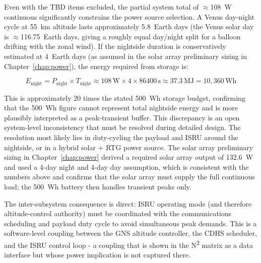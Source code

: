 Even with the TBD items excluded, the partial system total of $\approx$108~W continuous significantly constrains the power source selection. A Venus day-night cycle at 55~km altitude lasts approximately 5.8~Earth days (the Venus solar day is $\approx$116.75~Earth days, giving a roughly equal day/night split for a balloon drifting with the zonal wind). If the nightside duration is conservatively estimated at 4~Earth days (as assumed in the solar array preliminary sizing in Chapter~\ref{chap:power}), the energy required from storage is:

\begin{equation}
E_{\mathrm{night}} = P_{\mathrm{night}} \times T_{\mathrm{night}} \approx 108\,\mathrm{W} \times 4 \times 86400\,\mathrm{s} \approx 37.3\,\mathrm{MJ} = 10{,}360\,\mathrm{Wh}
\end{equation}

This is approximately 20 times the stated 500~Wh storage budget, confirming that the 500~Wh figure cannot represent total nightside energy and is more plausibly interpreted as a peak-transient buffer. This discrepancy is an open system-level inconsistency that must be resolved during detailed design. The resolution most likely lies in duty-cycling the payload and ISRU around the nightside, or in a hybrid solar + RTG power source. The solar array preliminary sizing in Chapter~\ref{chap:power} derived a required solar array output of 132.6~W and used a 4-day night and 4-day day assumption, which is consistent with the numbers above and confirms that the solar array must supply the full continuous load; the 500~Wh battery then handles transient peaks only.

The inter-subsystem consequence is direct: ISRU operating mode (and therefore altitude-control authority) must be coordinated with the communications scheduling and payload duty cycle to avoid simultaneous peak demands. This is a software-level coupling between the GNS altitude controller, the CDHS scheduler, and the ISRU control loop - a coupling that is shown in the N\textsuperscript{2} matrix as a data interface but whose power implication is not captured there.

